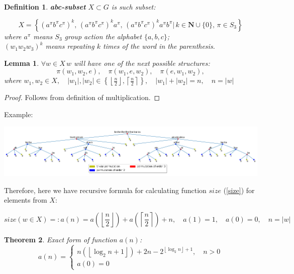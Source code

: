 \documentclass[a4paper,12pt]{amsart}
\newtheorem{definition}{Definition}
\newtheorem{theorem}{Theorem}
\newtheorem{lemma}[theorem]{Lemma}
\begin{document}
\begin{definition}
	\textbf{abc-subset} $X \subset  G$ is such subset:

	\begin{equation}
	X = \left\{ (a^\pi b^\pi c^\pi)^k, \, (a^\pi b^\pi c^\pi)^k a^\pi, \, (a^\pi b^\pi c^\pi)^k a^\pi b^\pi  |\, k \in \mathbf{N}\cup\{0\}, \, \pi \in S_3   \right\}
	\end{equation}
	where $a^\pi$ means $S_3$ group action the alphabet $\{a, b, c\}$; \\
	$(w_1 w_2 w_3)^k$ means repeating $k$ times of the word in the parenthesis.
	\\

\end{definition}

\begin{lemma}
	$\forall w \in X \, w$ will have one of the next possible structures:
	$$\pi (w_1, w_2, e), \quad \pi(w_1, e, w_2), \quad \pi(e, w_1, w_2), $$
	where $w_1, w_2 \in X, \quad |w_1|, |w_2| \in
	\left\{
		\left\lfloor
			\frac{n}{2}
		\right\rfloor,
		\left\lceil
			\frac{n}{2}
		\right\rceil
	\right\}, \quad |w_1| + |w_2| = n, \quad n = |w|$
	\\
\end{lemma}

\begin{proof}
	Follows from definition of multiplication.
\end{proof}

Example:

\includegraphics[scale=0.5]{../graphs/max_size_tree.png}

Therefore, here we have recursive formula for calculating function $size$ (\ref{size}) for elements from $X$:

$$size(w \in X) =: a (n) = a \left(
		\left\lfloor
			\frac{n}{2}
		\right\rfloor
	\right)
	+ a \left(
			\left\lceil
				\frac{n}{2}
			\right\rceil
		\right) + n, \quad a(1) = 1, \quad a(0) = 0, \quad n = |w|
$$

\begin{theorem}
	Exact form of function $a(n)$:
	\begin{equation}
	a(n) = \begin{cases}
	n \left(\left\lfloor \log_2 n + 1 \right\rfloor\right) + 2n - 2^{\left\lfloor\log_2 n\right\rfloor + 1}, \quad n > 0 \\
	a(0) = 0
	\end{cases}
	\end{equation}
\end{theorem}
\end{document}
